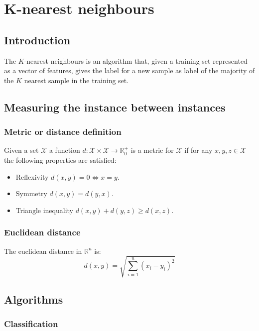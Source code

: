 \chapter{K-nearest neighbours}

\section{Introduction}
The $K$-nearest neighbours is an algorithm that, given a training set represented as a vector of features, gives the label for a new sample as label of the majority of the $K$ nearest sample in the training set.

\section{Measuring the instance between instances}

	\subsection{Metric or distance definition}
Given a set $\mathcal{X}$ a function $d:\mathcal{X}\times\mathcal{X}\rightarrow\mathbb{R}^{+}_0$ is a metric for $\mathcal{X}$ if for any $x,y,z\in \mathcal{X}$ the following properties are satisfied:

	\begin{multicols}{2}
		\begin{itemize}
			\item Reflexivity $d(x,y) = 0 \Leftrightarrow x = y$.
			\item Symmetry $d(x,y) = d(y,x)$.
			\item Triangle inequality $d(x, y) + d(y, z) \ge d(x, z)$.
		\end{itemize}
	\end{multicols}

	\subsection{Euclidean distance}
	The euclidean distance in $\mathbb{R}^n$ is:
	$$d(x,y) = \sqrt{\sum\limits_{i=1}^n(x_i-y_i)^2}$$

\section{Algorithms}

	\subsection{Classification}


